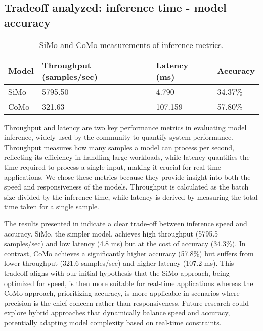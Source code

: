 \subsection{Tradeoff analyzed: inference time - model accuracy}\label{sec:experiments:exp2}


\begin{table}[t]
\centering
\caption{SiMo and CoMo measurements of inference metrics.}
\label{tab:eval:inference-times}
\begin{tabularx}{\linewidth} {XXXX}
    \toprule
    Model & Throughput (samples/sec) & Latency (ms) & Accuracy \\
    \midrule
     SiMo  & 5795.50                  & 4.790        & 34.37\%    \\
CoMo  & 321.63                   & 107.159      & 57.80\%  \\
    \bottomrule
\end{tabularx}
\end{table}


Throughput and latency are two key performance metrics in evaluating model inference, widely used by the community to quantify system performance. Throughput measures how many samples a model can process per second, reflecting its efficiency in handling large workloads, while latency quantifies the time required to process a single input, making it crucial for real-time applications. We chose these metrics because they provide insight into both the speed and responsiveness of the models. Throughput is calculated as the batch size divided by the inference time, while latency is derived by measuring the total time taken for a single sample.

The results presented in  indicate a clear trade-off between inference speed and accuracy. SiMo, the simpler model, achieves high throughput (5795.5 samples/sec) and low latency (4.8 ms) but at the cost of accuracy (34.3\%). In contrast, CoMo achieves a significantly higher accuracy (57.8\%) but suffers from lower throughput (321.6 samples/sec) and higher latency (107.2 ms). This tradeoff aligns with our initial hypothesis that the SiMo approach, being optimized for speed, is then more suitable for real-time applications whereas the CoMo approach, prioritizing accuracy, is more applicable in scenarios where precision is the chief concern rather than responsiveness. Future research could explore hybrid approaches that dynamically balance speed and accuracy, potentially adapting model complexity based on real-time constraints.
